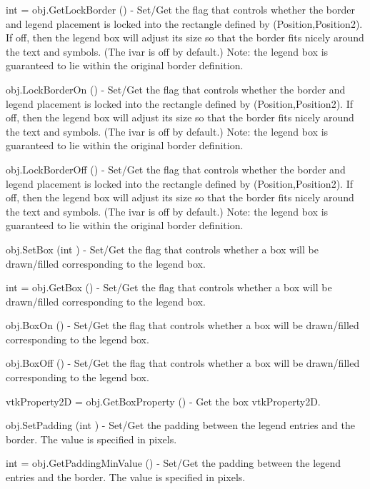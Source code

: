\begin{DoxyItemize}
\item {\ttfamily int = obj.\-Get\-Lock\-Border ()} -\/ Set/\-Get the flag that controls whether the border and legend placement is locked into the rectangle defined by (Position,Position2). If off, then the legend box will adjust its size so that the border fits nicely around the text and symbols. (The ivar is off by default.) Note\-: the legend box is guaranteed to lie within the original border definition.  
\item {\ttfamily obj.\-Lock\-Border\-On ()} -\/ Set/\-Get the flag that controls whether the border and legend placement is locked into the rectangle defined by (Position,Position2). If off, then the legend box will adjust its size so that the border fits nicely around the text and symbols. (The ivar is off by default.) Note\-: the legend box is guaranteed to lie within the original border definition.  
\item {\ttfamily obj.\-Lock\-Border\-Off ()} -\/ Set/\-Get the flag that controls whether the border and legend placement is locked into the rectangle defined by (Position,Position2). If off, then the legend box will adjust its size so that the border fits nicely around the text and symbols. (The ivar is off by default.) Note\-: the legend box is guaranteed to lie within the original border definition.  
\item {\ttfamily obj.\-Set\-Box (int )} -\/ Set/\-Get the flag that controls whether a box will be drawn/filled corresponding to the legend box.  
\item {\ttfamily int = obj.\-Get\-Box ()} -\/ Set/\-Get the flag that controls whether a box will be drawn/filled corresponding to the legend box.  
\item {\ttfamily obj.\-Box\-On ()} -\/ Set/\-Get the flag that controls whether a box will be drawn/filled corresponding to the legend box.  
\item {\ttfamily obj.\-Box\-Off ()} -\/ Set/\-Get the flag that controls whether a box will be drawn/filled corresponding to the legend box.  
\item {\ttfamily vtk\-Property2\-D = obj.\-Get\-Box\-Property ()} -\/ Get the box vtk\-Property2\-D.  
\item {\ttfamily obj.\-Set\-Padding (int )} -\/ Set/\-Get the padding between the legend entries and the border. The value is specified in pixels.  
\item {\ttfamily int = obj.\-Get\-Padding\-Min\-Value ()} -\/ Set/\-Get the padding between the legend entries and the border. The value is specified in pixels.  

\end{DoxyItemize}
